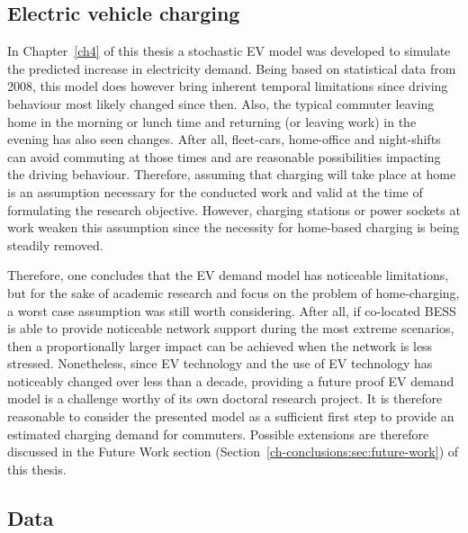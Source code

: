 \subsection{Electric vehicle charging}

In Chapter~\ref{ch4} of this thesis a stochastic EV model was developed to simulate the predicted increase in electricity demand.
Being based on statistical data from 2008, this model does however bring inherent temporal limitations since driving behaviour most likely changed since then.
Also, the typical commuter leaving home in the morning or lunch time and returning (or leaving work) in the evening has also seen changes.
After all, fleet-cars, home-office and night-shifts can avoid commuting at those times and are reasonable possibilities impacting the driving behaviour.
Therefore, assuming that charging will take place at home is an assumption necessary for the conducted work and valid at the time of formulating the research objective.
However, charging stations or power sockets at work weaken this assumption since the necessity for home-based charging is being steadily removed.

Therefore, one concludes that the EV demand model has noticeable limitations, but for the sake of academic research and focus on the problem of home-charging, a worst case assumption was still worth considering.
After all, if co-located BESS is able to provide noticeable network support during the most extreme scenarios, then a proportionally larger impact can be achieved when the network is less stressed.
Nonetheless, since EV technology and the use of EV technology has noticeably changed over less than a decade, providing a future proof EV demand model is a challenge worthy of its own doctoral research project.
It is therefore reasonable to consider the presented model as a sufficient first step to provide an estimated charging demand for commuters.
Possible extensions are therefore discussed in the Future Work section (Section~\ref{ch-conclusions:sec:future-work}) of this thesis.

\subsection{Data}


